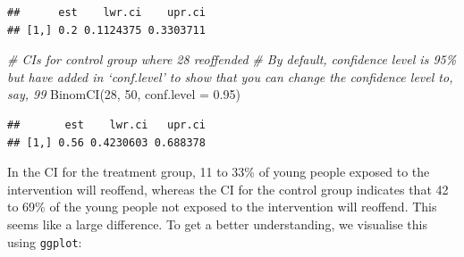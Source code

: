 \documentclass[
]{book}
\newenvironment{Shaded}{\begin{snugshade}}{\end{snugshade}}
\newcommand{\AttributeTok}[1]{\textcolor[rgb]{0.77,0.63,0.00}{#1}}
\newcommand{\CommentTok}[1]{\textcolor[rgb]{0.56,0.35,0.01}{\textit{#1}}}
\newcommand{\DecValTok}[1]{\textcolor[rgb]{0.00,0.00,0.81}{#1}}
\newcommand{\FloatTok}[1]{\textcolor[rgb]{0.00,0.00,0.81}{#1}}
\newcommand{\FunctionTok}[1]{\textcolor[rgb]{0.00,0.00,0.00}{#1}}
\newcommand{\NormalTok}[1]{#1}
\begin{document}
\begin{verbatim}
##      est    lwr.ci    upr.ci
## [1,] 0.2 0.1124375 0.3303711
\end{verbatim}

\begin{Shaded}
\begin{Highlighting}[]
\CommentTok{\# CIs for control group where 28 reoffended}
\CommentTok{\# By default, confidence level is 95\% but have added in ‘conf.level’ to show that you can change the confidence level to, say, 99 }
\FunctionTok{BinomCI}\NormalTok{(}\DecValTok{28}\NormalTok{, }\DecValTok{50}\NormalTok{, }\AttributeTok{conf.level =} \FloatTok{0.95}\NormalTok{)}
\end{Highlighting}
\end{Shaded}

\begin{verbatim}
##       est    lwr.ci   upr.ci
## [1,] 0.56 0.4230603 0.688378
\end{verbatim}

In the CI for the treatment group, 11 to 33\% of young people exposed to the intervention will reoffend, whereas the CI for the control group indicates that 42 to 69\% of the young people not exposed to the intervention will reoffend. This seems like a large difference. To get a better understanding, we visualise this using \texttt{ggplot}:
\end{document}
